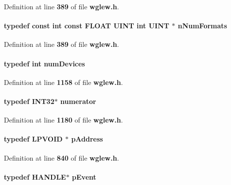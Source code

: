 Definition at line {\bf 389} of file {\bf wglew.\+h}.

\paragraph[{n\+Num\+Formats}]{\setlength{\rightskip}{0pt plus 5cm}typedef const {\bf int} const F\+L\+O\+AT {\bf U\+I\+NT} {\bf int} {\bf U\+I\+NT} $\ast$ {\bf n\+Num\+Formats}}\label{wglew_8h_aaa6694aa8869804a9ea240d2a0b0bac0}


Definition at line {\bf 389} of file {\bf wglew.\+h}.

\paragraph[{num\+Devices}]{\setlength{\rightskip}{0pt plus 5cm}typedef {\bf int} {\bf num\+Devices}}\label{wglew_8h_afc3b4efd994aedcffc2dac18a1728cd2}


Definition at line {\bf 1158} of file {\bf wglew.\+h}.

\paragraph[{numerator}]{\setlength{\rightskip}{0pt plus 5cm}typedef I\+N\+T32$\ast$ {\bf numerator}}\label{wglew_8h_a25f46232b6f4a7410d48b173460f06f2}


Definition at line {\bf 1180} of file {\bf wglew.\+h}.

\paragraph[{p\+Address}]{\setlength{\rightskip}{0pt plus 5cm}typedef {\bf L\+P\+V\+O\+ID} $\ast$ {\bf p\+Address}}\label{wglew_8h_a8fe88e10022de47f477797ce6a5af1e2}


Definition at line {\bf 840} of file {\bf wglew.\+h}.

\paragraph[{p\+Event}]{\setlength{\rightskip}{0pt plus 5cm}typedef {\bf H\+A\+N\+D\+LE}$\ast$ {\bf p\+Event}}\label{wglew_8h_a9773a57f1625c789c645a9d0d827f78d}


